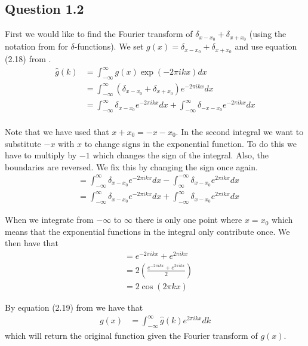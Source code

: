 \documentclass[a4paper, 10pt, final]{article}
\begin{document}
\subsection*{Question 1.2}
First we would like to find the Fourier transform of $\delta_{x - x_0} +
\delta_{x + x_0}$ (using the notation from \citeauthor{jahne-digital} for
$\delta$-functions). We set $g(x) = \delta_{x - x_0} + \delta_{x + x_0}$
and use equation (2.18) from \citeauthor{jahne-digital}.
\begin{align*}
    \hat{g}(k) & = \int_{-\infty}^{\infty}{g(x)\exp(-2\pi ikx)dx}\\
    & = \int_{-\infty}^{\infty}{(\delta_{x - x_0} + \delta_{x + x_0})e^{-2\pi ikx}dx}\\
    & = \int_{-\infty}^{\infty}{\delta_{x - x_0}e^{-2\pi ikx}dx +
    \int_{-\infty}^{\infty}{\delta_{-x - x_0}e^{-2\pi ikx}dx}}\\
\end{align*}

Note that we have used that $x + x_0 = -x - x_0$. In the second integral
we want to substitute $-x$ with $x$ to change signs in the exponential
function. To do this we have to multiply by $-1$ which changes the sign
of the integral. Also, the boundaries are reversed. We fix this by
changing the sign once again.
\begin{align*}
    & = \int_{-\infty}^{\infty}{\delta_{x - x_0}e^{-2\pi ikx}dx - \int_{\infty}^{-\infty}{\delta_{x - x_0}e^{2\pi ikx}dx}}\\
    & = \int_{-\infty}^{\infty}{\delta_{x - x_0}e^{-2\pi ikx}dx + \int_{-\infty}^{\infty}{\delta_{x - x_0}e^{2\pi ikx}dx}}
\end{align*}

When we integrate from $-\infty$ to $\infty$ there is only one point
where $x = x_0$ which means that the exponential functions in the
integral only contribute once. We then have that
\begin{align*}
    & = e^{-2\pi ikx} + e^{2\pi ikx}\\
    & = 2 \left(\frac{e^{-2\pi ikx} + e^{2\pi ikx}}{2}\right)\\
    & = 2 \cos(2\pi kx)
\end{align*}

By equation (2.19) from \citeauthor{jahne-digital} we have that
\begin{align*}
    g(x) & = \int_{-\infty}^{\infty}{\hat{g}(k)e^{2\pi ikx}dk}
\end{align*}
which will return the original function given the Fourier transform of
$g(x)$.
\end{document}
